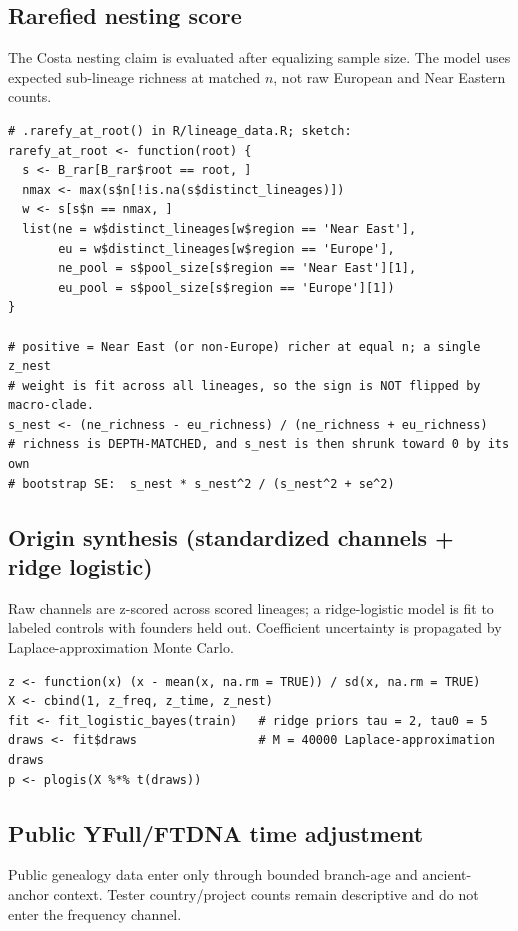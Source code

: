 \documentclass[11pt]{article}
\begin{document}
\subsection{Rarefied nesting score}
The Costa nesting claim is evaluated after equalizing sample size. The model uses expected sub-lineage richness at matched $n$, not raw European and Near Eastern counts.

\begingroup\footnotesize
\begin{verbatim}
# .rarefy_at_root() in R/lineage_data.R; sketch:
rarefy_at_root <- function(root) {
  s <- B_rar[B_rar$root == root, ]
  nmax <- max(s$n[!is.na(s$distinct_lineages)])
  w <- s[s$n == nmax, ]
  list(ne = w$distinct_lineages[w$region == 'Near East'],
       eu = w$distinct_lineages[w$region == 'Europe'],
       ne_pool = s$pool_size[s$region == 'Near East'][1],
       eu_pool = s$pool_size[s$region == 'Europe'][1])
}

# positive = Near East (or non-Europe) richer at equal n; a single z_nest
# weight is fit across all lineages, so the sign is NOT flipped by macro-clade.
s_nest <- (ne_richness - eu_richness) / (ne_richness + eu_richness)
# richness is DEPTH-MATCHED, and s_nest is then shrunk toward 0 by its own
# bootstrap SE:  s_nest * s_nest^2 / (s_nest^2 + se^2)
\end{verbatim}
\endgroup
\subsection{Origin synthesis (standardized channels + ridge logistic)}
Raw channels are z-scored across scored lineages; a ridge-logistic model is fit to labeled controls with founders held out. Coefficient uncertainty is propagated by Laplace-approximation Monte Carlo.

\begingroup\footnotesize
\begin{verbatim}
z <- function(x) (x - mean(x, na.rm = TRUE)) / sd(x, na.rm = TRUE)
X <- cbind(1, z_freq, z_time, z_nest)
fit <- fit_logistic_bayes(train)   # ridge priors tau = 2, tau0 = 5
draws <- fit$draws                 # M = 40000 Laplace-approximation draws
p <- plogis(X %*% t(draws))
\end{verbatim}
\endgroup
\subsection{Public YFull/FTDNA time adjustment}
Public genealogy data enter only through bounded branch-age and ancient-anchor context. Tester country/project counts remain descriptive and do not enter the frequency channel.
\end{document}
